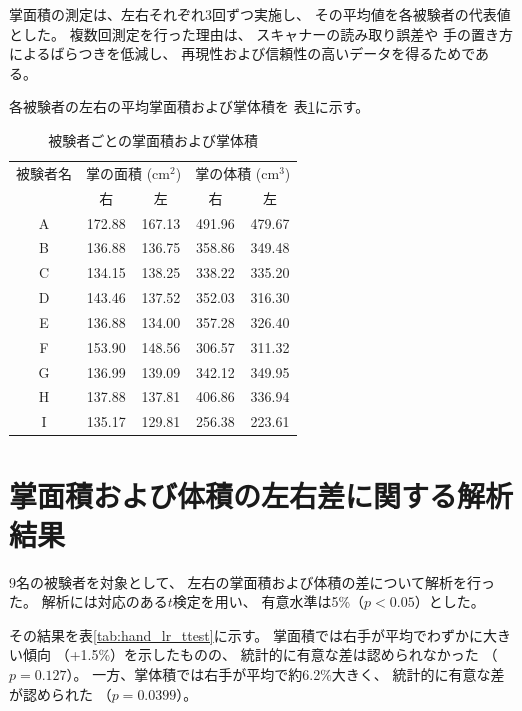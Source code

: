 掌面積の測定は、左右それぞれ3回ずつ実施し、
その平均値を各被験者の代表値とした。
複数回測定を行った理由は、
スキャナーの読み取り誤差や
手の置き方によるばらつきを低減し、
再現性および信頼性の高いデータを得るためである。

各被験者の左右の平均掌面積および掌体積を
表\ref{tab:hand_area_volume}に示す。

\begin{table}[htbp]
  \centering
  \caption{被験者ごとの掌面積および掌体積}
  \label{tab:hand_area_volume}
  \begin{tabular}{c|cc|cc}
    \hline
    被験者名 & \multicolumn{2}{c|}{掌の面積 (cm$^2$)} & \multicolumn{2}{c}{掌の体積 (cm$^3$)} \\
             & 右 & 左 & 右 & 左 \\
    \hline
    A & 172.88  & 167.13  & 491.96  & 479.67 \\
    B & 136.88  & 136.75  & 358.86  & 349.48 \\
    C & 134.15  & 138.25  & 338.22  & 335.20 \\
    D & 143.46  & 137.52  & 352.03  & 316.30 \\
    E & 136.88  & 134.00  & 357.28  & 326.40 \\
    F & 153.90  & 148.56  & 306.57  & 311.32 \\
    G & 136.99  & 139.09  & 342.12  & 349.95 \\
    H & 137.88  & 137.81  & 406.86  & 336.94 \\
    I & 135.17  & 129.81  & 256.38  & 223.61 \\
    \hline
  \end{tabular}
\end{table}


\section{掌面積および体積の左右差に関する解析結果}

9名の被験者を対象として、
左右の掌面積および体積の差について解析を行った。
解析には対応のある$t$検定を用い、
有意水準は5\%（$p<0.05$）とした。

その結果を表\ref{tab:hand_lr_ttest}に示す。
掌面積では右手が平均でわずかに大きい傾向
（+1.5\%）を示したものの、
統計的に有意な差は認められなかった
（$p=0.127$）。
一方、掌体積では右手が平均で約6.2\%大きく、
統計的に有意な差が認められた
（$p=0.0399$）。

